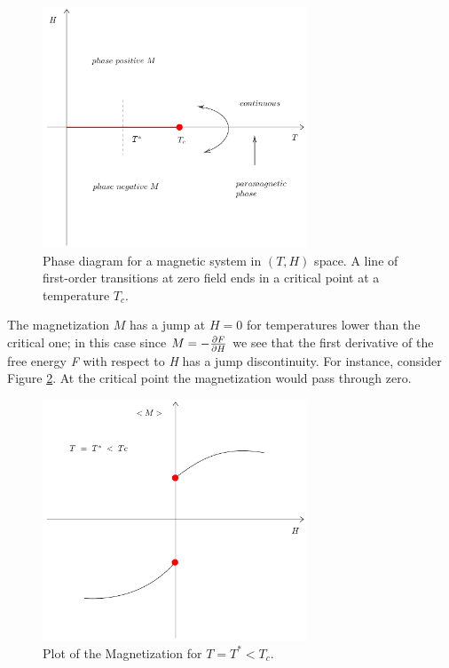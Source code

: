 \documentclass[../../Main/Main.tex]{subfiles}
\begin{document}
\begin{figure}[h!]
\centering
\includegraphics[width=0.7\textwidth]{./img/11.pdf}
\caption{\label{fig:2_10} Phase diagram for a magnetic system in \( (T,H) \) space. A line of first-order transitions at zero field ends in a critical point at a temperature \( T_c\). }
\end{figure}

The magnetization \( M \) has a jump at \( H=0 \) for temperatures lower than the critical one; in this case since \( M = - \pdv{F}{H}  \) we see that the first derivative of the free energy \emph{F} with respect to \emph{H} has a jump discontinuity.
For instance, consider Figure \ref{fig:2_11}. At  the critical point the magnetization would pass through zero.


\begin{figure}[h!]
\centering
\includegraphics[width=0.7\textwidth]{./img/12.pdf}
\caption{\label{fig:2_11} Plot of the Magnetization for \( T = T^* < T_c \).}
\end{figure}
\end{document}
